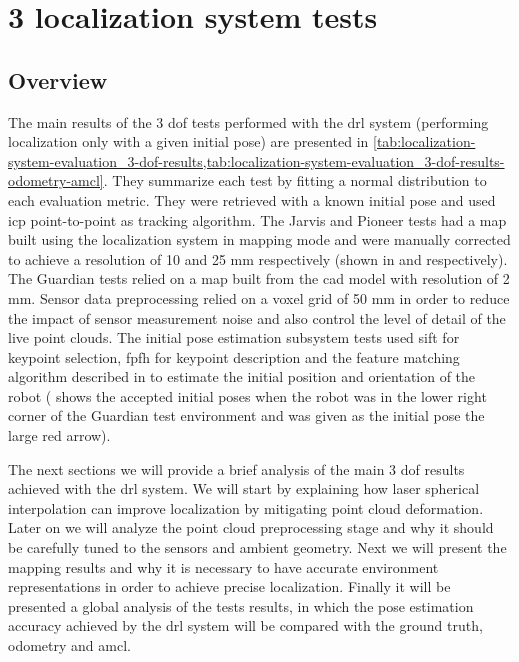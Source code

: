 \section{3  localization system tests}\label{sec:planar-localization-system-tests}


\subsection{Overview}

The main results of the 3 \gls{dof} tests performed with the \gls{drl} system (performing localization only with a given initial pose) are presented in \cref{tab:localization-system-evaluation_3-dof-results,tab:localization-system-evaluation_3-dof-results-odometry-amcl}. They summarize each test by fitting a normal distribution to each evaluation metric. They were retrieved with a known initial pose and used \gls{icp} point-to-point as tracking algorithm. The Jarvis and Pioneer tests had a map built using the localization system in mapping mode and were manually corrected to achieve a resolution of 10 and 25 mm respectively (shown in  and  respectively). The Guardian tests relied on a map built from the \gls{cad} model with resolution of 2 mm. Sensor data preprocessing relied on a voxel grid of 50 mm in order to reduce the impact of sensor measurement noise and also control the level of detail of the live point clouds. The initial pose estimation subsystem tests used \gls{sift} for keypoint selection, \gls{fpfh} for keypoint description and the feature matching algorithm described in  to estimate the initial position and orientation of the robot ( shows the accepted initial poses when the robot was in the lower right corner of the Guardian test environment and was given as the initial pose the large red arrow).

The next sections we will provide a brief analysis of the main 3 \gls{dof} results achieved with the \gls{drl} system. We will start by explaining how laser spherical interpolation can improve localization by mitigating point cloud deformation. Later on we will analyze the point cloud preprocessing stage and why it should be carefully tuned to the sensors and ambient geometry. Next we will present the mapping results and why it is necessary to have accurate environment representations in order to achieve precise localization. Finally it will be presented a global analysis of the tests results, in which the pose estimation accuracy achieved by the \gls{drl} system will be compared with the ground truth, odometry and \gls{amcl}.


